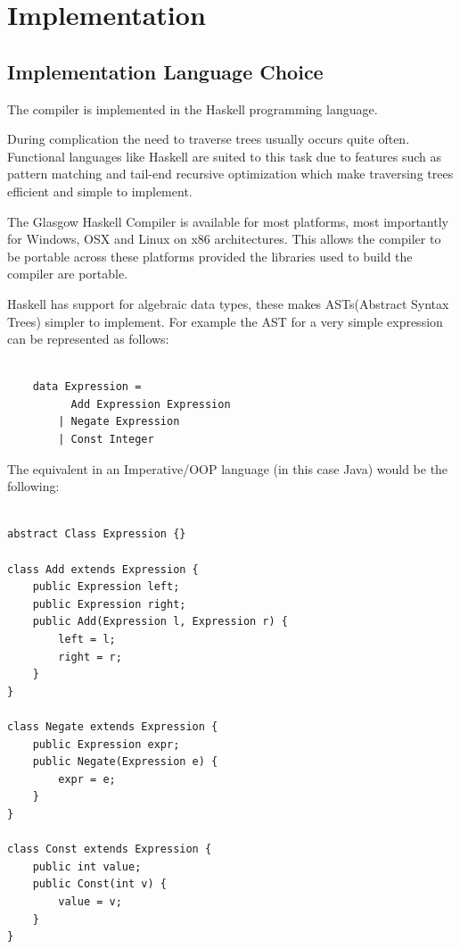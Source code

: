 \chapter{Implementation}


\section{Implementation Language Choice}

The compiler is implemented in the Haskell programming language.

During complication the need to traverse trees usually occurs quite
often. Functional languages like Haskell are suited to this task 
due to features such as pattern matching and tail-end recursive optimization 
which make traversing trees efficient and simple to implement.

The Glasgow Haskell Compiler is available for most platforms, most importantly for Windows, OSX and Linux 
on x86 architectures. This allows the compiler to be portable across these platforms provided the libraries 
used to build the compiler are portable.

Haskell has support for algebraic data types, these makes ASTs(Abstract Syntax Trees)
simpler to implement. For example the AST for a very simple expression
can be represented as follows:

\begin{lstlisting}[style=myHaskell]

    data Expression =
          Add Expression Expression
        | Negate Expression 
        | Const Integer

\end{lstlisting}

The equivalent in an Imperative/OOP language (in this case Java)
would be the following:

\begin{lstlisting}[style=myJava]

abstract Class Expression {}

class Add extends Expression {
    public Expression left;
    public Expression right;
    public Add(Expression l, Expression r) {
        left = l;
        right = r;    
    } 
}

class Negate extends Expression {
    public Expression expr;
    public Negate(Expression e) {
        expr = e;    
    }
} 

class Const extends Expression {
    public int value;
    public Const(int v) {
        value = v;
    }
}       

\end{lstlisting}

